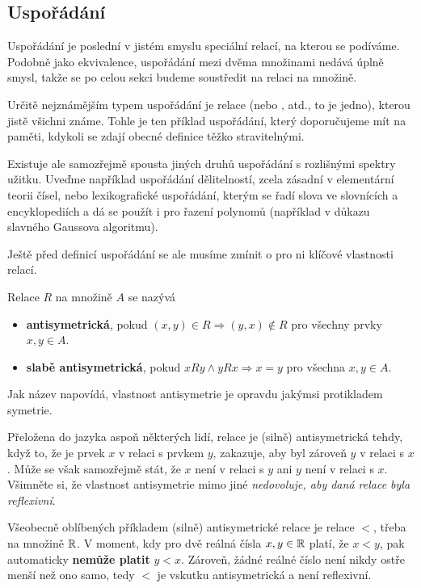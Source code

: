 \subsection{Uspořádání}
\label{ssec:usporadani}

Uspořádání je poslední v jistém smyslu speciální relací, na kterou se podíváme.
Podobně jako ekvivalence, uspořádání mezi dvěma množinami nedává úplně smysl,
takže se po celou sekci budeme soustředit na relaci na množině.

Určitě nejznámějším typem uspořádání je relace  (ne\-bo
,  atd., to je jedno), kterou jistě všichni
známe. Tohle je ten příklad uspořádání, který doporučujeme mít na paměti,
kdykoli se zdají obecné definice těžko stravitelnými.

Existuje ale samozřejmě spousta jiných druhů uspořádání s rozlišnými spektry
užitku. Uveďme například uspořádání dělitelností, zcela zásadní v elementární
teorii čísel, nebo lexikografické uspořádání, kterým se řadí slova ve slovnících
a encyklopediích a dá se použít i pro řazení polynomů (například v důkazu
slavného Gaussova algoritmu).

Ještě před definicí uspořádání se ale musíme zmínit o pro ni klíčové vlastnosti
relací.

\begin{definition}
 Relace $R$ na množině $A$ se nazývá
 \begin{itemize}
  \item \textbf{antisymetrická}, pokud $(x,y) \in R \Rightarrow (y,x) \notin R$
   pro všechny prvky ${x,y \in A}$.
  \item \textbf{slabě antisymetrická}, pokud $xRy \wedge yRx \Rightarrow x=y$ 
   pro všechna $x,y \in A$.
 \end{itemize}
\end{definition}

Jak název napovídá, vlastnost antisymetrie je opravdu jakýmsi protikladem
symetrie.

Přeložena do jazyka aspoň některých lidí, relace je (silně) antisymetrická
tehdy, když to, že je prvek $x$ v relaci s prvkem $y$, zakazuje, aby byl zároveň
$y$ v relaci s $x$. Může se však samozřejmě stát, že $x$ není v relaci s $y$ ani
$y$ není v relaci s $x$. Všimněte si, že vlastnost antisymetrie mimo jiné
\emph{nedovoluje, aby daná relace byla reflexivní}.

\begin{example}
 Všeobecně oblíbených příkladem (silně) antisymetrické relace je relace $<$,
 třeba na množině $\mathbb{R}$. V moment, kdy pro dvě reálná čísla $x,y \in \mathbb{R}$ platí,
 že $x<y$, pak automaticky \textbf{nemůže platit} $y<x$. Zároveň, žádné reálné
 číslo není nikdy ostře menší než ono samo, tedy $<$ je vskutku antisymetrická a
 není reflexivní.
\end{example}

